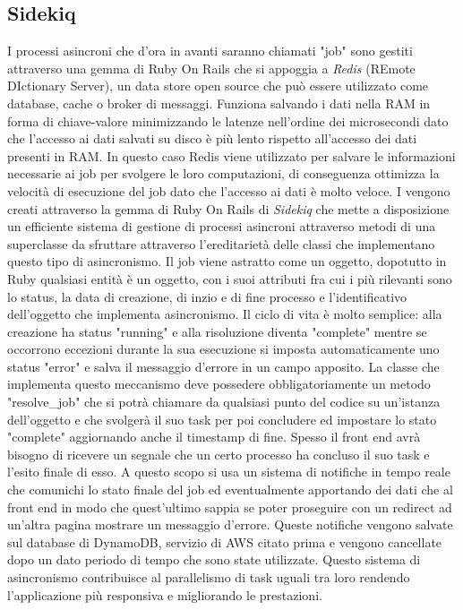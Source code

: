 \documentclass[target=bach,aauheader=,style=]{thud}
\begin{document}
\subsection{Sidekiq}
I processi asincroni che d'ora in avanti saranno chiamati "job" sono gestiti attraverso una gemma di Ruby On Rails che si appoggia a \textit{Redis}\cite{redis_home} (REmote DIctionary Server), un
data store open source che può essere utilizzato come database, cache o broker di messaggi. Funziona salvando i dati nella RAM in forma di chiave-valore minimizzando le latenze nell'ordine dei microsecondi
dato che l'accesso ai dati salvati su disco è più lento rispetto all'accesso dei dati presenti in RAM. In questo caso Redis viene utilizzato per salvare le informazioni necessarie ai
job per svolgere le loro computazioni, di conseguenza ottimizza la velocità di esecuzione del job dato che l'accesso ai dati è molto veloce.
I vengono creati attraverso la gemma di Ruby On Rails di \textit{Sidekiq}\cite{sidekiq} che mette a disposizione un efficiente sistema di gestione di processi asincroni attraverso
metodi di una superclasse da sfruttare attraverso l'ereditarietà delle classi che implementano questo tipo di asincronismo. Il job viene astratto come un oggetto, dopotutto in
Ruby qualsiasi entità è un oggetto, con i suoi attributi fra cui i più rilevanti sono lo status, la data di creazione, di inzio e di fine processo e l'identificativo dell'oggetto che
implementa asincronismo. Il ciclo di vita è molto semplice: alla creazione ha status "running" e alla risoluzione diventa "complete" mentre se occorrono eccezioni durante la sua esecuzione
si imposta automaticamente uno status "error" e salva il messaggio d'errore in un campo apposito. La classe che implementa questo meccanismo deve possedere obbligatoriamente un metodo
"resolve\_job" che si potrà chiamare da qualsiasi punto del codice su un'istanza dell'oggetto e che svolgerà il suo task per poi concludere ed impostare lo stato "complete" aggiornando
anche il timestamp di fine. Spesso il front end avrà bisogno di ricevere un segnale che un certo processo ha concluso il suo task e l'esito finale di esso.
A questo scopo si usa un sistema di notifiche in tempo reale che comunichi lo stato finale del job ed eventualmente apportando dei dati che al front end in modo che quest'ultimo sappia
se poter proseguire con un redirect ad un'altra pagina mostrare un messaggio d'errore. Queste notifiche vengono salvate sul database di DynamoDB, servizio di AWS citato
prima e vengono cancellate dopo un dato periodo di tempo che sono state utilizzate. Questo sistema di asincronismo contribuisce al parallelismo di task uguali tra loro rendendo
l'applicazione più responsiva e migliorando le prestazioni.
\end{document}
